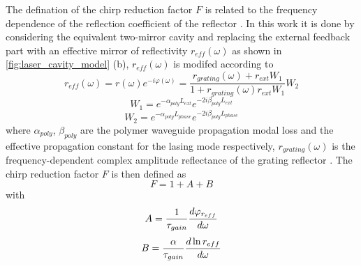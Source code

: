 
The defination of the chirp reduction factor $F$ is related to the frequency dependence of the reflection coefficient of the reflector \cite{petermann2012laser}. In this work it is done by considering the equivalent two-mirror cavity and replacing the external feedback part with an effective mirror of reflectivity $r_{eff}(\omega)$ as shown in \autoref{fig:laser_cavity_model} (b), $r_{eff}(\omega)$ is modifed according to \cite{kazarinov1987relation, coldren2012diode, komljenovic2015widely}
\begin{equation}
    r_{eff}(\omega)=r(\omega)e^{-i\varphi(\omega)}=\frac{r_{grating}(\omega)+r_{ext}W_1}{1+r_{grating}(\omega)r_{ext}W_1}W_2
    \label{eq:effective_reflectivity}
\end{equation}
\begin{equation}
    W_1=e^{-\alpha_{poly}L_{ext}}e^{-2i\beta_{poly}L_{ext}}
    \label{eq:propogation_external_cavity}
\end{equation}
\begin{equation}
    W_2=e^{-\alpha_{poly}L_{phase}}e^{-2i\beta_{poly}L_{phase}}
    \label{eq:propogation_polymer_wg}
\end{equation}
where $\alpha_{poly}$, $\beta_{poly}$ are the polymer waveguide propagation modal loss and the effective propagation constant for the lasing mode respectively, $r_{grating}(\omega)$ is the frequency-dependent complex amplitude reflectance of the grating reflector \cite{yariv1977periodic}.
The chirp reduction factor $F$ is then defined as \cite{kazarinov1987relation, petermann2012laser}
\begin{equation}
    F=1+A+B
    \label{eq:F_factor}
\end{equation}
with
\begin{equation}
    A=\frac{1}{\tau_{gain}}\dv{\varphi_{r_{eff}}}{\omega}
    \label{eq:F_factor_A}
\end{equation}
\begin{equation}
    B=\frac{\alpha}{\tau_{gain}}\dv{\ln{r_{eff}}}{\omega}
    \label{eq:F_factor_B}
\end{equation}
